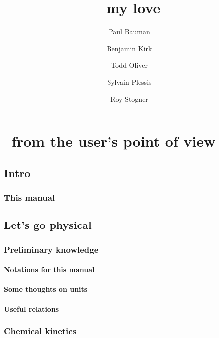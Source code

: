\documentclass{documentation}
\begin{document}
\title{\Antioch\ my love}
\date{}
\author{Paul Bauman \and Benjamin Kirk \and Todd Oliver \and Sylvain Plessis \and Roy Stogner}

\maketitle
\tableofcontents
\listoffigures
\listoftables



\part{\Antioch\ from the user's point of view}
\chapter{Intro}

\section{This manual}


\chapter{Let's go physical}
\chaptermark{\ANTIOCHPhys}
\label{Antioch:physics}

\section{Preliminary knowledge}

\subsection{Notations for this manual}


\subsection{Some thoughts on units}
\label{units_in_Antioch}


\subsection{Useful relations}
\label{relations}


\section{Chemical kinetics}
\end{document}
